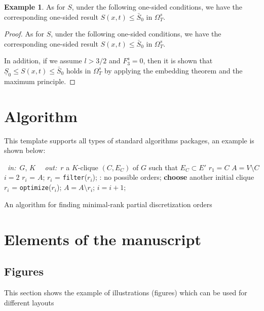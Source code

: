 \documentclass{itor}
\theoremstyle{definition}
\newtheorem{example}{Example}
\theoremstyle{remark}
\begin{document}
\begin{example}
As for $S$, under the following one-sided conditions, we have the corresponding one-sided result
$S(x,t) \leq \bar{S}_0$ in $\Omega_T^s$.%
\end{example}

\begin{proof}
As for $S$, under the following one-sided conditions, we have the corresponding one-sided result
$S(x,t) \leq \bar{S}_0$ in $\Omega_T^s$.%

In addition, if we assume $l > 3/2$ and $F_3^s = 0$, then it is shown that $\underline{S}_0 \leq S(x,t) \leq \bar{S}_0$ holds in $\Omega_T^s$ by applying the embedding theorem and the maximum principle.
\end{proof}


\section{Algorithm}
This template supports all types of standard algorithms packages, an example is shown below:

\begin{algorithm}[H]
\begin{algorithmic}[1]
 \, {\it in:}~$G$, $K$ \, \, {\it out:}~$r$
 a $K$-clique $(C,E_C)$ of $G$ such that $E_C \subset E'$  \label{clique}
 $r_1 = C$ %
 $A = V \setminus C$
 $i = 2$
   \STATE $r_i$ = $A$;
   \STATE $r_i$ = {\tt filter}($r_i$);  \label{linefilter}
      : no possible orders; {\bf choose} another initial clique
   \ELSE
      \STATE $r_i$ = {\tt optimize}($r_i$);  \label{lineoptimization}
      \STATE $A = A \setminus r_i$; \quad $i = i + 1$;
   \ENDIF
\ENDWHILE
\end{algorithmic}
\caption{An algorithm for finding minimal-rank partial discretization orders}  \label{greedy}
\end{algorithm}


\section{Elements of the manuscript}
\subsection{Figures}
This section shows the example of illustrations (figures) which can be used for different layouts
\end{document}
